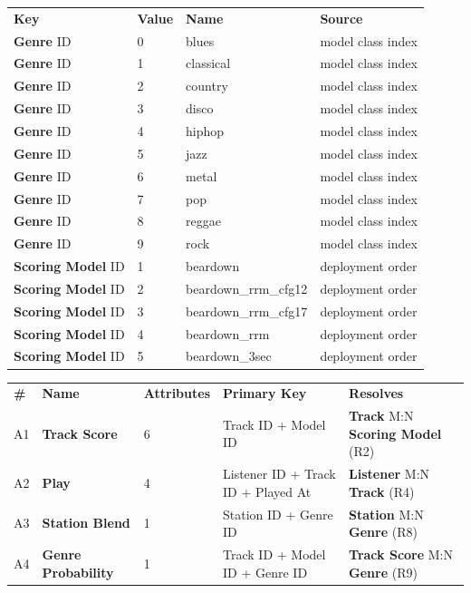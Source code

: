 \documentclass[11pt]{article}
\newcommand{\ent}[1]{\textcolor{entc}{\textbf{#1}}}
\newcommand{\asc}[1]{\textcolor{ascc}{\textbf{#1}}}
\begin{document}
\begin{longtable}{|L{1.30in}|L{0.80in}|L{2.00in}|L{2.20in}|}
\hline
{} \\ \hline
{}\textbf{Key} & \textbf{Value} & \textbf{Name} & \textbf{Source} \\ \hline
\ent{Genre} ID & 0 & blues & model class index \\ \hline
\ent{Genre} ID & 1 & classical & model class index \\ \hline
\ent{Genre} ID & 2 & country & model class index \\ \hline
\ent{Genre} ID & 3 & disco & model class index \\ \hline
\ent{Genre} ID & 4 & hiphop & model class index \\ \hline
\ent{Genre} ID & 5 & jazz & model class index \\ \hline
\ent{Genre} ID & 6 & metal & model class index \\ \hline
\ent{Genre} ID & 7 & pop & model class index \\ \hline
\ent{Genre} ID & 8 & reggae & model class index \\ \hline
\ent{Genre} ID & 9 & rock & model class index \\ \hline
\ent{Scoring Model} ID & 1 & beardown & deployment order \\ \hline
\ent{Scoring Model} ID & 2 & beardown\_rrm\_cfg12 & deployment order \\ \hline
\ent{Scoring Model} ID & 3 & beardown\_rrm\_cfg17 & deployment order \\ \hline
\ent{Scoring Model} ID & 4 & beardown\_rrm & deployment order \\ \hline
\ent{Scoring Model} ID & 5 & beardown\_3sec & deployment order \\ \hline
\end{longtable}

\begin{longtable}{|L{0.40in}|L{1.30in}|L{0.85in}|L{2.05in}|L{1.60in}|}
\hline
{} \\ \hline
{}\textbf{\#} & \textbf{Name} & \textbf{Attributes} & \textbf{Primary Key} & \textbf{Resolves} \\ \hline
A1 & \asc{Track Score} & 6 & Track ID + Model ID & \ent{Track} M:N \ent{Scoring Model} (R2) \\ \hline
A2 & \asc{Play} & 4 & Listener ID + Track ID + Played At & \ent{Listener} M:N \ent{Track} (R4) \\ \hline
A3 & \asc{Station Blend} & 1 & Station ID + Genre ID & \ent{Station} M:N \ent{Genre} (R8) \\ \hline
A4 & \asc{Genre Probability} & 1 & Track ID + Model ID + Genre ID & \asc{Track Score} M:N \ent{Genre} (R9) \\ \hline
\end{longtable}
\end{document}
